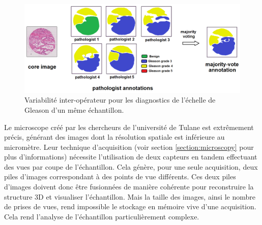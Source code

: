 {{        \begin{figure}[h]
            \centering
            \includegraphics[width=.7\linewidth]{img/gleason_bias.png}
            \captionsetup{width=.8\linewidth, labelfont=bf}
            \caption{Variabilité inter-opérateur pour les diagnostics de l'échelle de Gleason d'un même échantillon.\cite{cite_gleason_bias}}
            \label{img:gleason_bias}
        \end{figure}
        
        Le microscope créé par les chercheurs de l'université de Tulane est extrêmement précis, générant des images dont la résolution spatiale est inférieure au micromètre. Leur technique d'acquisition (voir section \ref{section:microscopy} pour plus d'informations) nécessite l'utilisation de deux capteurs en tandem effectuant des vues par coupe de l'échantillon. Cela génère, pour une seule acquisition, deux piles d'images correspondant à des points de vue différents. Ces deux piles d'images doivent donc être fusionnées de manière cohérente pour reconstruire la structure 3D et visualiser l'échantillon. Mais la taille des images, ainsi le nombre de prises de vues, rend impossible le stockage en mémoire vive d'une acquisition. Cela rend l'analyse de l'échantillon particulièrement complexe.
        }
        
}
